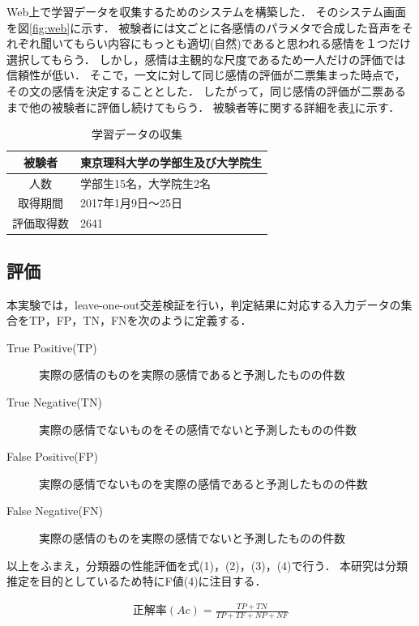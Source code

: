 Web上で学習データを収集するためのシステムを構築した．
そのシステム画面を図\ref{fig:web}に示す．
被験者には文ごとに各感情のパラメタで合成した音声をそれぞれ聞いてもらい内容にもっとも適切(自然)であると思われる感情を１つだけ選択してもらう．
しかし，感情は主観的な尺度であるため一人だけの評価では信頼性が低い．
そこで，一文に対して同じ感情の評価が二票集まった時点で，その文の感情を決定することとした．
したがって，同じ感情の評価が二票あるまで他の被験者に評価し続けてもらう．
被験者等に関する詳細を表\ref{enviroment}に示す．

\begin{table}[ht]
  \begin{center}
  \caption{学習データの収集}
  \label{enviroment}
  \begin{tabular}{|c|l|}
    \hline
    被験者 & 東京理科大学の学部生及び大学院生 \\ \hline
    人数 & 学部生15名，大学院生2名 \\ \hline
    取得期間 & 2017年1月9日〜25日 \\ \hline
    評価取得数 & 2641 \\ \hline
  \end{tabular}
  \end{center}
\end{table}

\subsection{評価}
本実験では，leave-one-out交差検証を行い，判定結果に対応する入力データの集合をTP，FP，TN，FNを次のように定義する．

\begin{description}
   \item[True Positive(TP)] 実際の感情のものを実際の感情であると予測したものの件数
   \item[True Negative(TN)] 実際の感情でないものをその感情でないと予測したものの件数
   \item[False Positive(FP)] 実際の感情でないものを実際の感情であると予測したものの件数
   \item[False Negative(FN)] 実際の感情のものを実際の感情でないと予測したものの件数
 \end{description}


以上をふまえ，分類器の性能評価を式(1)，(2)，(3)，(4)で行う．
本研究は分類推定を目的としているため特にF値(4)に注目する．

\begin{eqnarray}
  正解率(Ac) =  \frac{TP + TN} {TP + TF + NP + NF}
\end{eqnarray}

